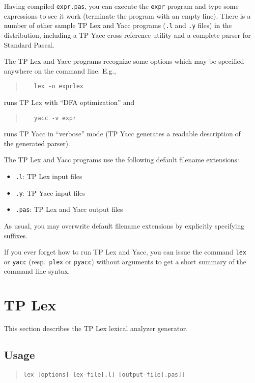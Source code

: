 Having compiled \verb"expr.pas", you can execute the \verb"expr" program and
type some expressions to see it work (terminate the program with an empty
line).  There is a number of other sample TP Lex and Yacc programs (\verb".l"
and \verb".y" files) in the distribution, including a TP Yacc cross reference
utility and a complete parser for Standard Pascal.

The TP Lex and Yacc programs recognize some options which may be specified
anywhere on the command line. E.g.,
\begin{quote}\begin{verbatim}
   lex -o exprlex
\end{verbatim}\end{quote}
runs TP Lex with ``DFA optimization'' and
\begin{quote}\begin{verbatim}
   yacc -v expr
\end{verbatim}\end{quote}
runs TP Yacc in ``verbose'' mode (TP Yacc generates a readable description
of the generated parser).

The TP Lex and Yacc programs use the following default filename extensions:
\begin{itemize}
   \item \verb".l": TP Lex input files
   \item \verb".y": TP Yacc input files
   \item \verb".pas": TP Lex and Yacc output files
\end{itemize}
As usual, you may overwrite default filename extensions by explicitly
specifying suffixes.

If you ever forget how to run TP Lex and Yacc, you can issue the command
\verb"lex" or \verb"yacc" (resp.\ \verb"plex" or \verb"pyacc")
without arguments to get a short summary of the command line syntax.

\section{TP Lex}

This section describes the TP Lex lexical analyzer generator.

\subsection{Usage}

\begin{quote}\begin{verbatim}
lex [options] lex-file[.l] [output-file[.pas]]
\end{verbatim}\end{quote}

